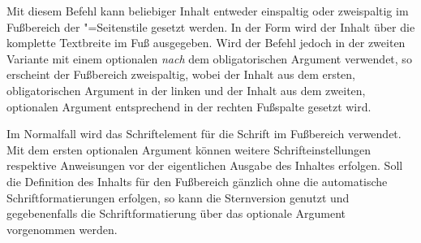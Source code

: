 \begin{Declaration}[v2.04]{%
}
\begin{Declaration}[v2.04]{
}
\printdeclarationlist%
%
%
Mit diesem Befehl kann beliebiger Inhalt entweder einspaltig oder zweispaltig 
im Fußbereich der "=Seitenstile gesetzt werden. In der 
Form  wird der Inhalt über die komplette 
Textbreite im Fuß ausgegeben. Wird der Befehl jedoch in der zweiten Variante 
 mit 
einem optionalen \emph{nach} dem obligatorischen Argument verwendet, so 
erscheint der Fußbereich zweispaltig, wobei der Inhalt aus dem ersten, 
obligatorischen Argument in der linken und der Inhalt aus dem zweiten, 
optionalen Argument entsprechend in der rechten Fußspalte gesetzt wird.

Im Normalfall wird das Schriftelement  für die Schrift im 
Fußbereich verwendet. Mit dem ersten optionalen Argument können weitere 
Schrifteinstellungen respektive Anweisungen vor der eigentlichen Ausgabe des 
Inhaltes erfolgen. Soll die Definition des Inhalts für den Fußbereich gänzlich 
ohne die automatische Schriftformatierungen erfolgen, so kann die Sternversion 
 genutzt und gegebenenfalls die Schriftformatierung über 
das optionale Argument vorgenommen werden.
\end{Declaration}
\end{Declaration}

